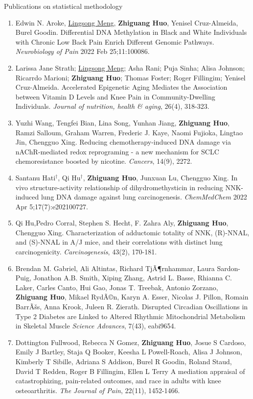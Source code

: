 \documentclass{resume} %
\begin{document}
\begin{rSection}{Publications on statistical methodology}
\begin{enumerate}[noitemsep,topsep=0pt, resume]
\item
Edwin N. Aroke, \underline{Lingsong Meng}, {\bf Zhiguang Huo}, Yenisel Cruz-Almeida, Burel Goodin.
Differential DNA Methylation in Black and White Individuals with Chronic Low Back Pain Enrich Different Genomic Pathways. 
\emph{Neurobiology of Pain} 2022 Feb 25;11:100086. 
\label{bioinfo_29} 


\item
Larissa Jane Strath; \underline{Lingsong Meng}; Asha Rani; Puja Sinha; Alisa Johnson; Ricarrdo Marioni; {\bf Zhiguang Huo}; Thomas Foster; Roger Fillingim; Yenisel Cruz-Almeida. 
Accelerated Epigenetic Aging Mediates the Association between Vitamin D Levels and Knee Pain in Community-Dwelling Individuals. 
\emph{Journal of nutrition, health \& aging}, 26(4), 318-323.


\item
Yuzhi Wang, Tengfei Bian, Lina Song, Yunhan Jiang, {\bf Zhiguang Huo}, Ramzi Salloum, Graham Warren, Frederic J. Kaye, Naomi Fujioka, Lingtao Jin, Chengguo Xing.
Reducing chemotherapy-induced DNA damage via nAChR-mediated redox reprograming - a new mechanism for SCLC chemoresistance boosted by nicotine.
\emph{Cancers}, 14(9), 2272.

\item
Santanu Hati$^\dagger$, Qi Hu$^\dagger$, {\bf Zhiguang Huo}, Junxuan Lu, Chengguo Xing. 
In vivo structure-activity relationship of dihydromethysticin in reducing NNK-induced lung DNA damage against lung carcinogenesis.
\emph{ChemMedChem} 2022 Apr 5;17(7):e202100727.

\item
Qi Hu,Pedro Corral, Stephen S. Hecht, F. Zahra Aly,  {\bf Zhiguang Huo}, Chengguo Xing.
Characterization of adductomic totality of NNK, (R)-NNAL, and (S)-NNAL in A/J mice, and their correlations with distinct lung carcinogenicity. 
\emph{Carcinogenesis}, 43(2), 170-181.


\item  
Brendan M. Gabriel, Ali Altintas, Richard TjÃ¶rnhammar, Laura Sardon-Puig, Jonathon A.B. Smith, Xiping Zhang, Astrid L. Basse, Rhianna C. Laker, Carles Canto, Hui Gao, Jonas T. Treebak, Antonio Zorzano, {\bf Zhiguang Huo}, Mikael RydÃ©n, Karyn A. Esser, Nicolas J. Pillon, Romain BarrÃšs, Anna Krook, Juleen R. Zierath. 
Disrupted Circadian Oscillations in Type 2 Diabetes are Linked to Altered Rhythmic Mitochondrial Metabolism in Skeletal Muscle
\emph{Science Advances}, 7(43), eabi9654.
\label{bioinfo_28} 


\item  
Dottington Fullwood, Rebecca N Gomez, {\bf Zhiguang Huo}, Josue S Cardoso, Emily J Bartley, Staja Q Booker, Keesha L Powell-Roach, Alisa J Johnson, Kimberly T Sibille, Adriana S Addison, Burel R Goodin, Roland Staud, David T Redden, Roger B Fillingim, Ellen L Terry
A mediation appraisal of catastrophizing, pain-related outcomes, and race in adults with knee osteoarthritis. 
\emph{The Journal of Pain}, 22(11), 1452-1466.


\end{enumerate}
\end{rSection}
\end{document}
